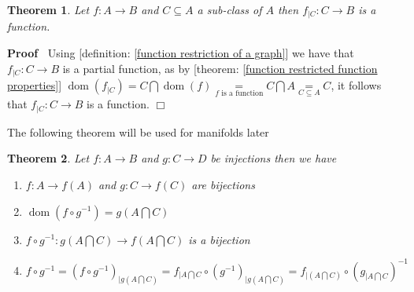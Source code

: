 \documentclass{book}
\newcommand{\equallim}{\mathop{=}\limits}
\newcommand{\tmop}[1]{\ensuremath{\operatorname{#1}}}
\newenvironment{proof}{\noindent\textbf{Proof\ }}{\hspace*{\fill}$\Box$\medskip}
\newtheorem{theorem}{Theorem}
\begin{document}
\begin{theorem}
  \label{function restriction of a function}Let $f : A \rightarrow B$ and $C
  \subseteq A$ a sub-class of $A$ then $f_{|C} : C \rightarrow B$ is a
  function.
\end{theorem}

\begin{proof}
  Using [definition: \ref{function restriction of a graph}] we have that
  $f_{|C} : C \rightarrow B$ is a partial function, as by [theorem:
  \ref{function restricted function properties}] $\tmop{dom} (f_{|C}) = C
  \bigcap \tmop{dom} (f) \equallim_{f \text{ is a function}} C \bigcap A
  \equallim_{C \subseteq A} C$, it follows that $f_{|C} : C \rightarrow B$ is
  a function.
\end{proof}

The following theorem will be used for manifolds later

\begin{theorem}
  Let $f : A \rightarrow B$ and $g : C \rightarrow D$ be injections then we
  have
  \begin{enumerate}
    \item $f : A \rightarrow f (A)$ and $g : C \rightarrow f (C)$ are
    bijections
    
    \item $\tmop{dom} (f \circ g^{- 1}) = g \left( A \bigcap C \right)$
    
    \item $f \circ g^{- 1} : g \left( A \bigcap C \right) \rightarrow f \left(
    A \bigcap C \right)$ is a bijection
    
    \item $f \circ g^{- 1} = (f \circ g^{- 1})_{|g \left( A \bigcap C \right)}
    = f_{|A \bigcap C} \circ (g^{- 1})_{|g \left( A \bigcap C \right)} = f_{|
    \left( A \bigcap C \right)} \circ \left( g_{|A \bigcap C} \right)^{- 1}$
  \end{enumerate}
\end{theorem}
\end{document}
